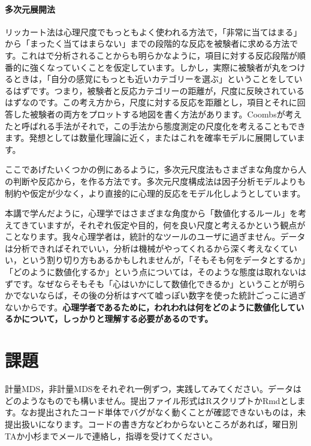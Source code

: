\documentclass{ltjsbook}
\begin{document}
\paragraph{多次元展開法}リッカート法は心理尺度でもっともよく使われる方法で，「非常に当てはまる」から「まったく当てはまらない」までの段階的な反応を被験者に求める方法です。これはで分析されることからも明らかなように，項目に対する反応段階が順番的に強くなっていくことを仮定しています。しかし，実際に被験者が丸をつけるときは，「自分の感覚にもっとも近いカテゴリーを選ぶ」ということをしているはずです。つまり，被験者と反応カテゴリーの距離が，尺度に反映されているはずなのです。この考え方から，尺度に対する反応を距離とし，項目とそれに回答した被験者の両方をプロットする地図を書く方法があります。Coombsが考えたと呼ばれる手法がそれで，この手法から態度測定の尺度化を考えることもできます。発想としては数量化理論に近く，また\textcite{shimizu2018}はこれを確率モデルに展開しています。

ここであげたいくつかの例にあるように，多次元尺度法もさまざまな角度から人の判断や反応から，を作る方法です。多次元尺度構成法は因子分析モデルよりも制約や仮定が少なく，より直接的に心理的反応をモデル化しようとしています。

本講で学んだように，心理学ではさまざまな角度から「数値化するルール」を考えてきていますが，それぞれ仮定や目的，何を良い尺度と考えるかという観点がことなります。我々心理学者は，統計的なツールのユーザに過ぎません。データは分析できればそれでいい，分析は機械がやってくれるから深く考えなくていい，という割り切り方もあるかもしれませんが，「そもそも何をデータとするか」「どのように数値化するか」という点については，そのような態度は取れないはずです。なぜならそもそも「心はいかにして数値化できるか」ということが明らかでないならば，その後の分析はすべて嘘っぽい数字を使った統計ごっこに過ぎないからです。\textbf{心理学者であるために，われわれは何をどのように数値化しているかについて，しっかりと理解する必要があるのです。}

\section{課題}
計量MDS，非計量MDSをそれぞれ一例ずつ，実践してみてください。データはどのようなものでも構いません。提出ファイル形式はRスクリプトかRmdとします。なお提出されたコード単体でバグがなく動くことが確認できないものは，未提出扱いになります。コードの書き方などわからないところがあれば，曜日別TAか小杉までメールで連絡し，指導を受けてください。
\end{document}
